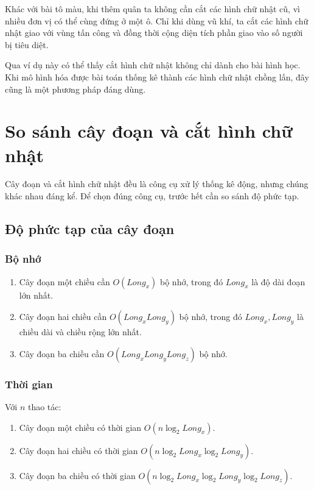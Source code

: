 \documentclass[11pt]{article}
\begin{document}
Khác với bài tô màu, khi thêm quân ta không cần cắt các hình chữ nhật cũ, vì
nhiều đơn vị có thể cùng đứng ở một ô. Chỉ khi dùng vũ khí, ta cắt các hình
chữ nhật giao với vùng tấn công và đồng thời cộng diện tích phần giao vào số
người bị tiêu diệt.

Qua ví dụ này có thể thấy cắt hình chữ nhật không chỉ dành cho bài hình học.
Khi mô hình hóa được bài toán thống kê thành các hình chữ nhật chồng lấn, đây
cũng là một phương pháp đáng dùng.

\section{So sánh cây đoạn và cắt hình chữ nhật}

Cây đoạn và cắt hình chữ nhật đều là công cụ xử lý thống kê động, nhưng chúng
khác nhau đáng kể. Để chọn đúng công cụ, trước hết cần so sánh độ phức tạp.

\subsection{Độ phức tạp của cây đoạn}

\subsubsection{Bộ nhớ}

\begin{enumerate}
  \item Cây đoạn một chiều cần $O(\textit{Long}_x)$ bộ nhớ, trong đó
  $\textit{Long}_x$ là độ dài đoạn lớn nhất.
  \item Cây đoạn hai chiều cần
  $O(\textit{Long}_x\textit{Long}_y)$ bộ nhớ, trong đó
  $\textit{Long}_x,\textit{Long}_y$ là chiều dài và chiều rộng lớn nhất.
  \item Cây đoạn ba chiều cần
  $O(\textit{Long}_x\textit{Long}_y\textit{Long}_z)$ bộ nhớ.
\end{enumerate}

\subsubsection{Thời gian}

Với $n$ thao tác:
\begin{enumerate}
  \item Cây đoạn một chiều có thời gian
  $O(n\log_2\textit{Long}_x)$.
  \item Cây đoạn hai chiều có thời gian
  $O(n\log_2\textit{Long}_x\log_2\textit{Long}_y)$.
  \item Cây đoạn ba chiều có thời gian
  $O(n\log_2\textit{Long}_x\log_2\textit{Long}_y\log_2\textit{Long}_z)$.
\end{enumerate}
\end{document}
